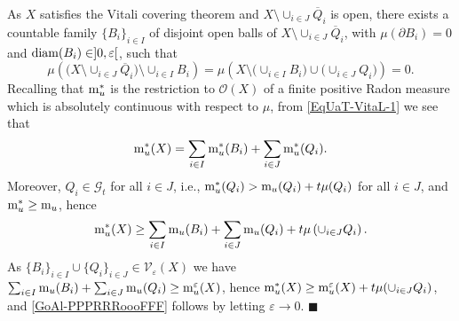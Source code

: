 \documentclass[10pt]{amsart}
\numberwithin{equation}{section}
\theoremstyle{definition}
\theoremstyle{remark}
\begin{document}
As $X$ satisfies the Vitali covering theorem and $X\setminus {\mathop{\cup}}_{i\in J}\overline{Q}_i$ is open, there exists a countable family $\{B_i\}_{i\in I}$ of disjoint open balls of $X\setminus {\mathop{\cup}}_{i\in J}\overline{Q}_i$, with $\mu(\partial B_i)=0$ and ${\rm diam}(B_i)\in]0,{\varepsilon}[$, such that
\begin{equation}\label{EqUaT-VitaL-1}
\mu\left(\Big(X\setminus{\mathop{\cup}}_{i\in J}\overline{Q}_i\Big)\setminus {\mathop{\cup}}_{i\in I}B_i\right)=\mu\left(X\setminus\Big({\mathop{\cup}}_{i\in I}B_i\Big)\cup\Big({\mathop{\cup}}_{i\in J}Q_i\Big)\right)=0.
\end{equation}
Recalling that ${\rm m}^*_u$ is the restriction to $\mathcal{O}(X)$ of a finite positive Radon measure  which is absolutely continuous with respect to $\mu$, from \eqref{EqUaT-VitaL-1} we see that
$$
{\rm m}^*_u(X)=\sum_{i\in I}{\rm m}^*_u(B_i)+\sum_{i\in J}{\rm m}^*_u(Q_i).
$$
Moreover, $Q_i\in\mathcal{G}_t$ for all $i\in J$, i.e., ${\rm m}^*_u(Q_i)>{\rm m}_u(Q_i)+t\mu(Q_i)$ for all $i\in J$, and ${\rm m}^*_u\geq {\rm m}_u$, hence 
$$
{\rm m}^*_u(X)\geq \sum_{i\in I}{\rm m}_u(B_i)+\sum_{i\in J}{\rm m}_u(Q_i)+t\mu\left({\mathop{\cup}}_{i\in J}Q_i\right).
$$
As $\{B_i\}_{i\in I}\cup\{Q_i\}_{i\in J}\in\mathcal{V}_{\varepsilon}(X)$ we have $\sum_{i\in I}{\rm m}_u(B_i)+\sum_{i\in J}{\rm m}_u(Q_i)\geq{\rm m}_u^{\varepsilon}(X)$, hence ${\rm m}^*_u(X)\geq {\rm m}^{\varepsilon}_u(X)+t\mu({\mathop{\cup}}_{i\in J}Q_i)$, and \eqref{GoAl-PPPRRRoooFFF} follows by letting ${\varepsilon}\to0$. {$\blacksquare$}
\end{document}
